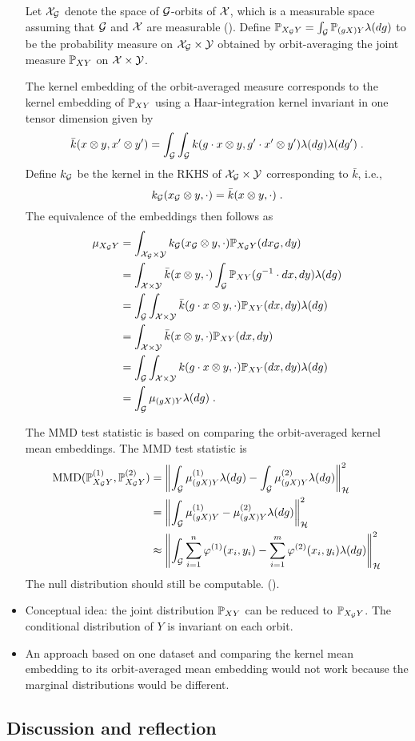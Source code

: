 \begin{itemize}
Let $\calX_\calG$ denote the space of $\calG$-orbits of $\calX$, which is a measurable space assuming that $\calG$ and $\calX$ are measurable (\todo). Define $\P_{X_\calG Y}=\int_{\calG}\bbP_{(gX)Y}\lambda(dg)$ to be the probability measure on $\calX_\calG\times\calY$ obtained by orbit-averaging the joint measure $\P_{XY}$ on $\calX\times\calY$.

The kernel embedding of the orbit-averaged measure corresponds to the kernel embedding of $\P_{XY}$ using a Haar-integration kernel \parencite{Haasdonk:2005} invariant in one tensor dimension given by
\[
\bar{k}(x\otimes y,x'\otimes y')=\int_\calG\int_\calG k(g\cdot x\otimes y, g'\cdot x'\otimes y')\lambda(dg)\lambda(dg')\;.
\]
Define $k_\calG$ be the kernel in the RKHS of $\calX_\calG\times\calY$ corresponding to $\bar{k}$, i.e.,
\[
k_\calG(x_\calG\otimes y,\cdot) = \bar{k}(x\otimes y,\cdot)\;.
\]
The equivalence of the embeddings then follows as
\begin{align*}
\mu_{X_\calG Y} &= \int_{\calX_\calG\times\calY}k_\calG(x_\calG\otimes y,\cdot)\P_{X_\calG Y}(dx_\calG,dy) \\
&= \int_{\calX\times\calY}\bar{k}(x\otimes y,\cdot)\int_\calG\bbP_{XY}(g^{-1}\cdot dx,dy)\lambda(dg) \\
&= \int_\calG\int_{\calX\times\calY}\bar{k}(g\cdot x\otimes y,\cdot)\bbP_{XY}(dx,dy)\lambda(dg) \\
&= \int_{\calX\times\calY}\bar{k}(x\otimes y,\cdot)\bbP_{XY}(dx,dy) \\
&= \int_\calG\int_{\calX\times\calY}k(g\cdot x\otimes y,\cdot)\bbP_{XY}(dx,dy)\lambda(dg) \\
&= \int_\calG\mu_{(gX)Y}\lambda(dg) \;.
\end{align*}

The MMD test statistic is based on comparing the orbit-averaged kernel mean embeddings. The MMD test statistic is \todo
\begin{align*}
\mathrm{MMD}(\P_{X_\calG Y}^{(1)},\P_{X_\calG Y}^{(2)}) &= \left\|\int_\calG\mu_{(gX)Y}^{(1)}\lambda(dg) - \int_\calG\mu_{(gX)Y}^{(2)}\lambda(dg)\right\|_\calH^2 \\
&= \left\|\int_\calG\mu_{(gX)Y}^{(1)} - \mu_{(gX)Y}^{(2)}\lambda(dg)\right\|_\calH^2 \\
&\approx \left\|\int_\calG\sum_{i=1}^n\varphi^{(1)}(x_i,y_i) - \sum_{i=1}^m\varphi^{(2)}(x_i,y_i)\lambda(dg)\right\|_\calH^2
\end{align*}
The null distribution should still be computable. (\todo).

\item
Conceptual idea: the joint distribution $\bbP_{XY}$ can be reduced to $\bbP_{X_\calG Y}$. The conditional distribution of $Y$ is invariant on each orbit.

\item
An approach based on one dataset and comparing the kernel mean embedding to its orbit-averaged mean embedding would not work because the marginal distributions would be different.

\end{itemize}


\subsection{Discussion and reflection} \label{sec:discussion}